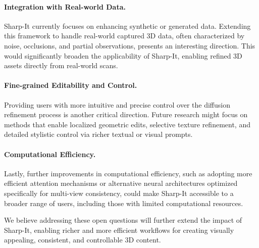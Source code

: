 \paragraph{Integration with Real-world Data.}
Sharp-It currently focuses on enhancing synthetic or generated data. Extending this framework to handle real-world captured 3D data, often characterized by noise, occlusions, and partial observations, presents an interesting direction. This would significantly broaden the applicability of Sharp-It, enabling refined 3D assets directly from real-world scans.

\paragraph{Fine-grained Editability and Control.}
Providing users with more intuitive and precise control over the diffusion refinement process is another critical direction. Future research might focus on methods that enable localized geometric edits, selective texture refinement, and detailed stylistic control via richer textual or visual prompts.

\paragraph{Computational Efficiency.}
Lastly, further improvements in computational efficiency, such as adopting more efficient attention mechanisms or alternative neural architectures optimized specifically for multi-view consistency, could make Sharp-It accessible to a broader range of users, including those with limited computational resources.

We believe addressing these open questions will further extend the impact of Sharp-It, enabling richer and more efficient workflows for creating visually appealing, consistent, and controllable 3D content.